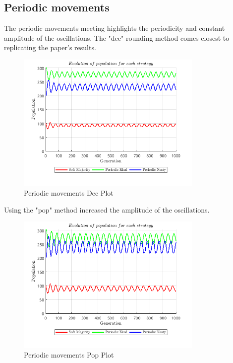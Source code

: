 \documentclass[12pt]{article}
\begin{document}
\subsection{Periodic movements}
The periodic movements meeting highlights the periodicity and constant amplitude of the oscillations. The "dec" rounding method comes closest to replicating the paper's results.
\begin{figure}[H]
    \centering
    \includegraphics[width=0.8\textwidth]{media/periodic_movements_dec.png}
    \caption{Periodic movements Dec Plot}
\end{figure}
Using the "pop" method increased the amplitude of the oscillations.
\begin{figure}[H]
    \centering
    \includegraphics[width=0.8\textwidth]{media/periodic_movements_pop.png}
    \caption{Periodic movements Pop Plot}
\end{figure}
\end{document}
